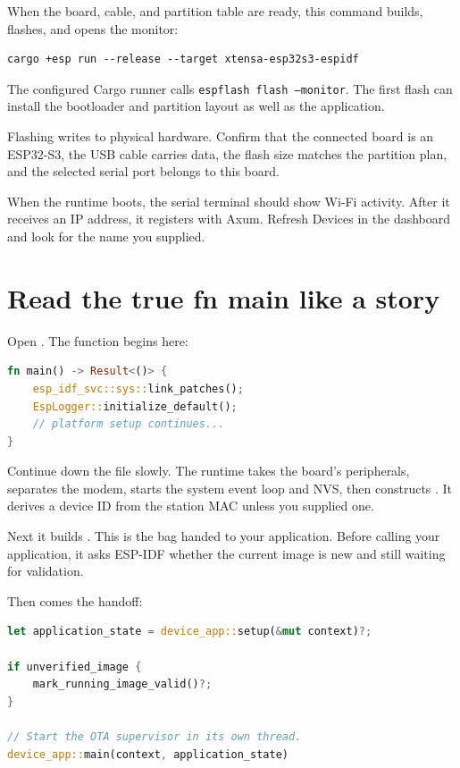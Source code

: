 When the board, cable, and partition table are ready, this command builds, flashes, and opens the monitor:

\begin{lstlisting}
cargo +esp run --release --target xtensa-esp32s3-espidf
\end{lstlisting}

The configured Cargo runner calls \texttt{espflash flash --monitor}. The first flash can install the bootloader and partition layout as well as the application.

\begin{warningbox}
Flashing writes to physical hardware. Confirm that the connected board is an ESP32-S3, the USB cable carries data, the flash size matches the partition plan, and the selected serial port belongs to this board.
\end{warningbox}

When the runtime boots, the serial terminal should show Wi-Fi activity. After it receives an IP address, it registers with Axum. Refresh Devices in the dashboard and look for the name you supplied.

\section{Read the true fn main like a story}

Open . The function begins here:

\begin{lstlisting}[language=Rust,numbers=none]
fn main() -> Result<()> {
    esp_idf_svc::sys::link_patches();
    EspLogger::initialize_default();
    // platform setup continues...
}
\end{lstlisting}

Continue down the file slowly. The runtime takes the board's peripherals, separates the modem, starts the system event loop and NVS, then constructs . It derives a device ID from the station MAC unless you supplied one.

Next it builds . This is the bag handed to your application. Before calling your application, it asks ESP-IDF whether the current image is new and still waiting for validation.

Then comes the handoff:

\begin{lstlisting}[language=Rust]
let application_state = device_app::setup(&mut context)?;

if unverified_image {
    mark_running_image_valid()?;
}

// Start the OTA supervisor in its own thread.
device_app::main(context, application_state)
\end{lstlisting}

